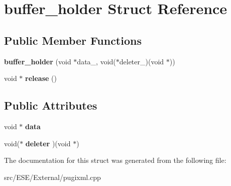 \hypertarget{structbuffer__holder}{\section{buffer\-\_\-holder Struct Reference}
\label{structbuffer__holder}
}
\subsection*{Public Member Functions}
\begin{DoxyCompactItemize}
\item 
\hypertarget{structbuffer__holder_aec91ad4dabc8db2a6cacac601b317857}{{\bfseries buffer\-\_\-holder} (void $\ast$data\-\_\-, void($\ast$deleter\-\_\-)(void $\ast$))}\label{structbuffer__holder_aec91ad4dabc8db2a6cacac601b317857}

\item 
\hypertarget{structbuffer__holder_add9b75027bdf15dee0e2dc88225d5b10}{void $\ast$ {\bfseries release} ()}\label{structbuffer__holder_add9b75027bdf15dee0e2dc88225d5b10}

\end{DoxyCompactItemize}
\subsection*{Public Attributes}
\begin{DoxyCompactItemize}
\item 
\hypertarget{structbuffer__holder_a06c1e1004fac90848dfdb4fbc150cede}{void $\ast$ {\bfseries data}}\label{structbuffer__holder_a06c1e1004fac90848dfdb4fbc150cede}

\item 
\hypertarget{structbuffer__holder_a96e7067c68bc1f7a9ee7dd75c84f04e8}{void($\ast$ {\bfseries deleter} )(void $\ast$)}\label{structbuffer__holder_a96e7067c68bc1f7a9ee7dd75c84f04e8}

\end{DoxyCompactItemize}


The documentation for this struct was generated from the following file\-:\begin{DoxyCompactItemize}
\item 
src/\-E\-S\-E/\-External/pugixml.\-cpp\end{DoxyCompactItemize}
